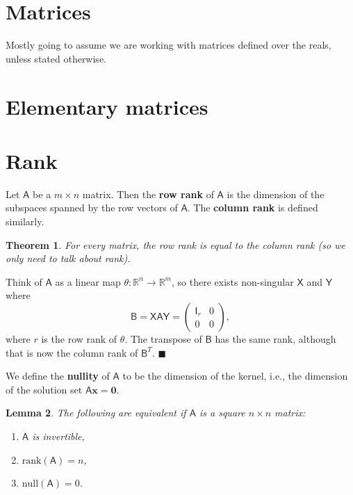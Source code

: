 \documentclass[letter-paper]{tufte-book}
\newtheorem{theorem}{\color{pastel-blue}Theorem}[section]
\newtheorem{lemma}[theorem]{\color{pastel-blue}Lemma}
\newenvironment{proof}[1][Proof]{\begin{trivlist}
\item[\hskip \labelsep {\bfseries #1}]}{\end{trivlist}}
\newcommand{\As}{{\mathsf{A}}}
\newcommand{\Bs}{{\mathsf{B}}}
\newcommand{\Is}{{\mathsf{I}}}
\newcommand{\Xs}{{\mathsf{X}}}
\newcommand{\Ys}{{\mathsf{Y}}}
\newcommand{\Ob}{{\boldsymbol{0}}}
\newcommand{\xb}{{\boldsymbol{x}}}
\newcommand{\qed}{\hfill$\blacksquare$}
\begin{document}

\section{Matrices}

Mostly going to assume we are working with matrices defined over the reals,
unless stated otherwise.


\section{Elementary matrices}


\section{Rank}

Let $\As$ be a $m\times n$ matrix. Then the \textbf{row rank} of $\As$ is the
dimension of the subspaces spanned by the row vectors of $\As$. The
\textbf{column rank} is defined similarly.

\begin{theorem}
  For every matrix, the row rank is equal to the column rank (so we only need to
  talk about \emph{rank}).
\end{theorem}

\begin{proof}
  Think of $\As$ as a linear map $\theta: \mathbb{R}^n \to \mathbb{R}^m$, so
  there exists non-singular $\Xs$ and $\Ys$ where
  \begin{equation*}
    \Bs = \Xs \As \Ys = \begin{pmatrix}\Is_r & 0 \\ 0 & 0 \end{pmatrix},
  \end{equation*}
  where $r$ is the row rank of $\theta$. The transpose of $\Bs$ has the same
  rank, although that is now the column rank of $\Bs^T$. \qed
\end{proof}

We define the \textbf{nullity} of $\As$ to be the dimension of the kernel, i.e.,
the dimension of the solution set $\As\xb = \Ob$.

\begin{lemma}
  The following are equivalent if $\As$ is a square $n\times n$ matrix:
  \begin{enumerate}
    \item $\As$ is invertible,
    \item $\mbox{rank}(\As) = n$,
    \item $\mbox{null}(\As) = 0$.
  \end{enumerate}
\end{lemma}
\end{document}
